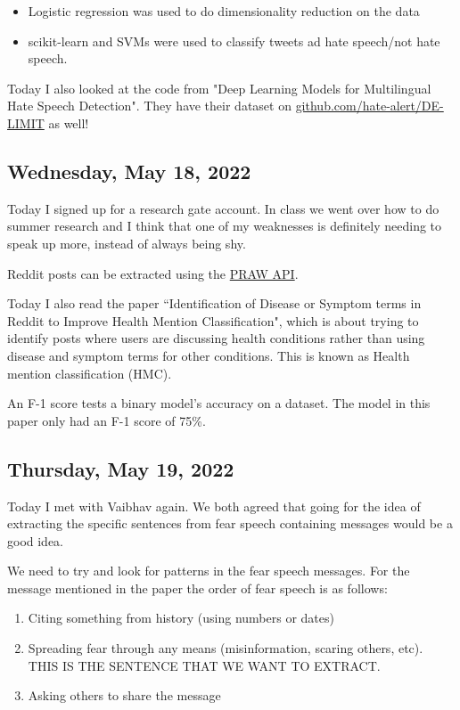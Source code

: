 \documentclass[11pt,letterpaper]{article}
\begin{document}
\begin{itemize}
    \item Logistic regression was used to do dimensionality reduction on the data
    \item scikit-learn and SVMs were used to classify tweets ad hate speech/not hate speech.
\end{itemize}

Today I also looked at the code from "Deep Learning Models for Multilingual Hate Speech Detection". They have their dataset on \href{https://github.com/hate-alert/DE-LIMIT}{github.com/hate-alert/DE-LIMIT} as well!

\subsection{Wednesday, May 18, 2022}
Today I signed up for a research gate account. In class we went over how to do summer research and I think that one of my weaknesses is definitely needing to speak up more, instead of always being shy.

Reddit posts can be extracted using the \href{https://praw.readthedocs.io/en/stable/}{PRAW API}.

Today I also read the paper ``Identification of Disease or Symptom terms in Reddit to Improve Health Mention Classification", which is about trying to identify posts where users are discussing health conditions rather than using disease and symptom terms for other conditions. This is known as Health mention classification (HMC).

An F-1 score tests a binary model's accuracy on a dataset. The model in this paper only had an F-1 score of 75\%.

\subsection{Thursday, May 19, 2022}
Today I met with Vaibhav again. We both agreed that going for the idea of extracting the specific sentences from fear speech containing messages would be a good idea. 

We need to try and look for patterns in the fear speech messages. For the message mentioned in the paper the order of fear speech is as follows:
\begin{enumerate}
    \item Citing something from history (using numbers or dates)
    \item Spreading fear through any means (misinformation, scaring others, etc). THIS IS THE SENTENCE THAT WE WANT TO EXTRACT.
    \item Asking others to share the message
\end{enumerate}
\end{document}
